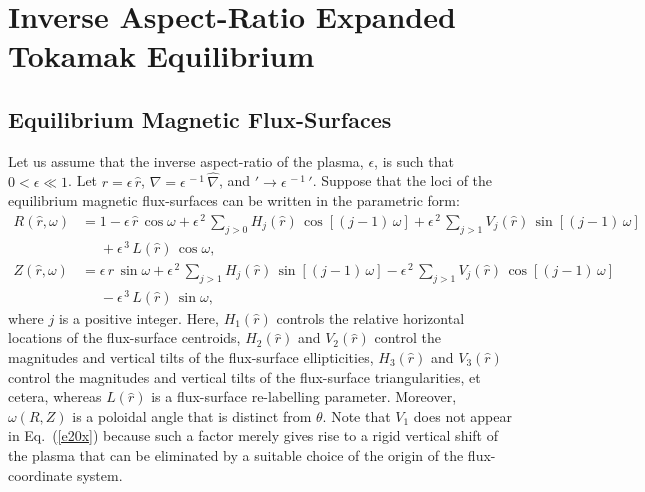 \documentclass[12pt,prb,aps]{revtex4-1}
\begin{document}
\section{Inverse Aspect-Ratio Expanded Tokamak Equilibrium}\label{large}

\subsection{Equilibrium Magnetic Flux-Surfaces}\label{flux}
Let us assume that the inverse aspect-ratio of the plasma, $\epsilon$, is such that $0<\epsilon\ll 1$.  
Let $r=\epsilon\,\hat{r}$, $\nabla =\epsilon^{\,-1}\,\hat{\nabla}$, and $'\rightarrow \epsilon^{\,-1}\,'$. 
Suppose that the loci of the equilibrium magnetic flux-surfaces can be written in the parametric form:\,\cite{con0,gim,am1,fitz2024}
\begin{align}
R(\hat{r},\omega) &= 1 -\epsilon\,\hat{r}\,\cos\omega + \epsilon^{\,2}\,\sum_{j>0}H_j(\hat{r})\,\cos[(j-1)\,\omega] + \epsilon^{\,2}\,\sum_{j>1}V_j(\hat{r})\,\sin[(j-1)\,\omega] \nonumber\\[0.5ex]
&\phantom{=}+\epsilon^{\,3}\,L(\hat{r})\,\cos\omega,\label{e19x}\\[0.5ex]
Z(\hat{r},\omega)&= \epsilon\,\hat{r}\,\sin\omega +\epsilon^{\,2}\,\sum_{j>1}H_j(\hat{r})\,\sin[(j-1)\,\omega]
-\epsilon^{\,2}\,\sum_{j>1}V_j(\hat{r})\,\cos[(j-1)\,\omega]\nonumber\\[0.5ex]&\phantom{=}-\epsilon^{\,3}\,L(\hat{r})\,\sin\omega,\label{e20x}
\end{align}
where $j$ is a positive integer. 
Here, $H_1(\hat{r})$  controls the relative horizontal locations of the flux-surface centroids, $H_2(\hat{r})$ and $V_2(\hat{r})$ control the 
magnitudes and vertical tilts of the flux-surface ellipticities, $H_3(\hat{r})$ and
$V_3(\hat{r})$ control the magnitudes and vertical tilts of the flux-surface triangularities, et cetera, whereas $L(\hat{r})$ is a
flux-surface re-labelling parameter. Moreover, $\omega(R,Z)$ is a  poloidal angle that is distinct from $\theta$. Note that $V_1$ does not appear in Eq.~(\ref{e20x})
because such a factor merely gives rise to a rigid vertical shift of the plasma that can be eliminated by a suitable choice of the
origin of the flux-coordinate system.\cite{fitz2024}
\end{document}
